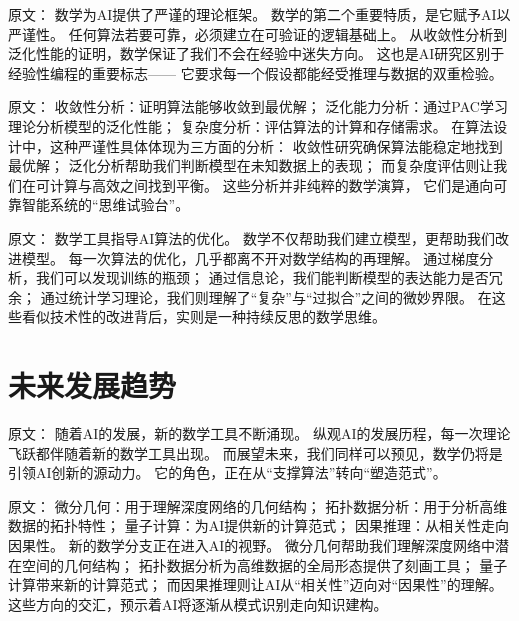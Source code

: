 原文：
数学为AI提供了严谨的理论框架。
数学的第二个重要特质，是它赋予AI以严谨性。  
任何算法若要可靠，必须建立在可验证的逻辑基础上。  
从收敛性分析到泛化性能的证明，数学保证了我们不会在经验中迷失方向。  
这也是AI研究区别于经验性编程的重要标志——  
它要求每一个假设都能经受推理与数据的双重检验。



原文：
收敛性分析：证明算法能够收敛到最优解；
泛化能力分析：通过PAC学习理论分析模型的泛化性能；
复杂度分析：评估算法的计算和存储需求。
在算法设计中，这种严谨性具体体现为三方面的分析：  
收敛性研究确保算法能稳定地找到最优解；  
泛化分析帮助我们判断模型在未知数据上的表现；  
而复杂度评估则让我们在可计算与高效之间找到平衡。  
这些分析并非纯粹的数学演算，  
它们是通向可靠智能系统的“思维试验台”。



原文：
数学工具指导AI算法的优化。
数学不仅帮助我们建立模型，更帮助我们改进模型。  
每一次算法的优化，几乎都离不开对数学结构的再理解。  
通过梯度分析，我们可以发现训练的瓶颈；  
通过信息论，我们能判断模型的表达能力是否冗余；  
通过统计学习理论，我们则理解了“复杂”与“过拟合”之间的微妙界限。  
在这些看似技术性的改进背后，实则是一种持续反思的数学思维。



\section{未来发展趋势}

原文：
随着AI的发展，新的数学工具不断涌现。
纵观AI的发展历程，每一次理论飞跃都伴随着新的数学工具出现。  
而展望未来，我们同样可以预见，数学仍将是引领AI创新的源动力。  
它的角色，正在从“支撑算法”转向“塑造范式”。



原文：
微分几何：用于理解深度网络的几何结构；
拓扑数据分析：用于分析高维数据的拓扑特性；
量子计算：为AI提供新的计算范式；
因果推理：从相关性走向因果性。
新的数学分支正在进入AI的视野。  
微分几何帮助我们理解深度网络中潜在空间的几何结构；  
拓扑数据分析为高维数据的全局形态提供了刻画工具；  
量子计算带来新的计算范式；  
而因果推理则让AI从“相关性”迈向对“因果性”的理解。  
这些方向的交汇，预示着AI将逐渐从模式识别走向知识建构。



